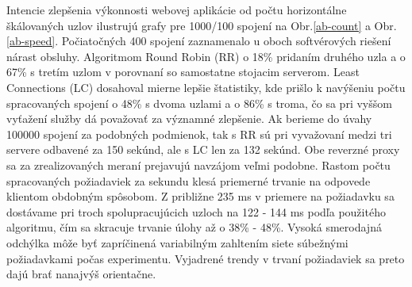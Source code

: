 \documentclass[12pt, a4paper]{article}
\begin{document}
Intencie zlepšenia výkonnosti webovej aplikácie od počtu horizontálne škálovaných uzlov ilustrujú
grafy pre 1000/100 spojení na Obr.\ref{ab-count} a Obr.\ref{ab-speed}. Počiatočných 400 spojení 
zaznamenalo u oboch softvérových riešení nárast obsluhy. Algoritmom Round Robin (RR) o 18\% pridaním 
druhého uzla a o 67\% s tretím uzlom v porovnaní so samostatne stojacim serverom. Least Connections (LC)
dosahoval mierne lepšie štatistiky, kde prišlo k navýšeniu počtu spracovaných spojení o 48\% 
s dvoma uzlami a o 86\% s troma, čo sa pri vyššom vyťažení služby dá považovať za významné zlepšenie.
Ak berieme do úvahy 100000 spojení za podobných podmienok, tak s RR sú pri vyvažovaní medzi tri servere
odbavené za 150 sekúnd, ale s LC len za 132 sekúnd. Obe reverzné proxy sa za zrealizovaných meraní prejavujú 
navzájom veľmi podobne. Rastom počtu spracovaných požiadaviek za sekundu klesá priemerné trvanie na odpovede 
klientom obdobným spôsobom. Z približne 235 ms v priemere na požiadavku sa dostávame pri troch 
spolupracujúcich uzloch na 122 - 144 ms podľa použitého algoritmu, čím sa skracuje trvanie úlohy až o
38\% - 48\%. Vysoká smerodajná odchýlka môže byť zapríčinená variabilným zahltením siete súbežnými 
požiadavkami počas experimentu. Vyjadrené trendy v trvaní požiadaviek sa preto dajú brať nanajvýš orientačne.
\end{document}
